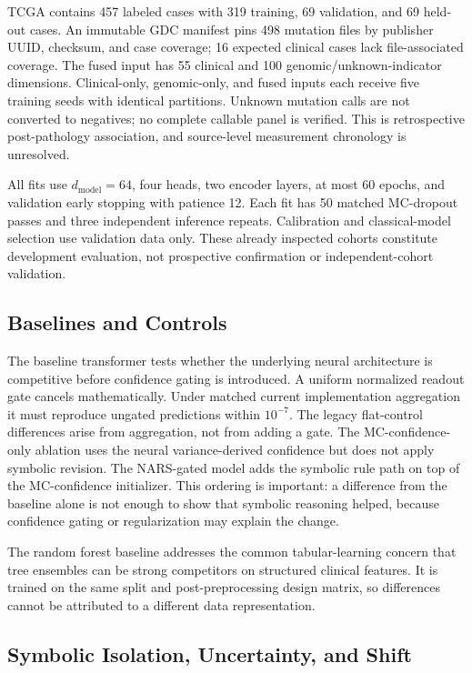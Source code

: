 \documentclass{article}
\begin{document}
TCGA contains 457 labeled cases with 319 training, 69 validation, and 69 held-out cases. An immutable GDC manifest pins 498 mutation files by publisher UUID, checksum, and case coverage; 16 expected clinical cases lack file-associated coverage. The fused input has 55 clinical and 100 genomic/unknown-indicator dimensions. Clinical-only, genomic-only, and fused inputs each receive five training seeds with identical partitions. Unknown mutation calls are not converted to negatives; no complete callable panel is verified. This is retrospective post-pathology association, and source-level measurement chronology is unresolved.

All fits use $d_{\mathrm{model}}=64$, four heads, two encoder layers, at most 60 epochs, and validation early stopping with patience 12. Each fit has 50 matched MC-dropout passes and three independent inference repeats. Calibration and classical-model selection use validation data only. These already inspected cohorts constitute development evaluation, not prospective confirmation or independent-cohort validation.

\subsection{Baselines and Controls}

The baseline transformer tests whether the underlying neural architecture is competitive before confidence gating is introduced. A uniform normalized readout gate cancels mathematically. Under matched current implementation aggregation it must reproduce ungated predictions within $10^{-7}$. The legacy flat-control differences arise from aggregation, not from adding a gate. The MC-confidence-only ablation uses the neural variance-derived confidence but does not apply symbolic revision. The NARS-gated model adds the symbolic rule path on top of the MC-confidence initializer. This ordering is important: a difference from the baseline alone is not enough to show that symbolic reasoning helped, because confidence gating or regularization may explain the change.

The random forest baseline addresses the common tabular-learning concern that tree ensembles can be strong competitors on structured clinical features. It is trained on the same split and post-preprocessing design matrix, so differences cannot be attributed to a different data representation.

\subsection{Symbolic Isolation, Uncertainty, and Shift}
\end{document}
